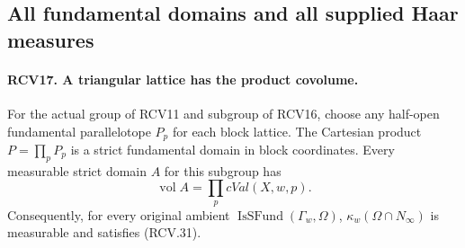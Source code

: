 \subsection{All fundamental domains and all supplied Haar measures}

\paragraph{RCV17. A triangular lattice has the product covolume.}
\label{claim:RCV17}
For the actual group of RCV11 and subgroup of RCV16, choose any
half-open fundamental parallelotope \(P_p\) for each block lattice.
The Cartesian product \(P=\prod_p P_p\) is a strict fundamental
domain in block coordinates.  Every measurable strict domain
\(A\) for this subgroup has
\[
                     \operatorname{vol}A=\prod_p cVal(X,w,p).
\tag{RCV.31}
\]
Consequently, for every original ambient
\(\operatorname{IsSFund}(\Gamma_w,\Omega)\),
\(\kappa_w(\Omega\cap N_\infty)\) is measurable and satisfies
(RCV.31).
